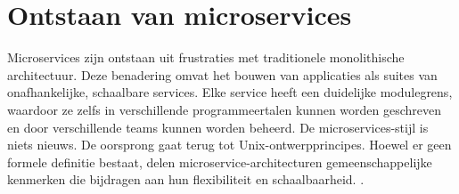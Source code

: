 \section{Ontstaan van microservices}
Microservices zijn ontstaan uit frustraties met traditionele monolithische architectuur. Deze benadering omvat het bouwen van applicaties als suites van onafhankelijke, schaalbare services. Elke service heeft een duidelijke modulegrens, waardoor ze zelfs in verschillende programmeertalen kunnen worden geschreven en door verschillende teams kunnen worden beheerd. De microservices-stijl is niets nieuws. De oorsprong gaat terug tot Unix-ontwerpprincipes. Hoewel er geen formele definitie bestaat, delen microservice-architecturen gemeenschappelijke kenmerken die bijdragen aan hun flexibiliteit en schaalbaarheid. \autocite{Fowler2014}.

